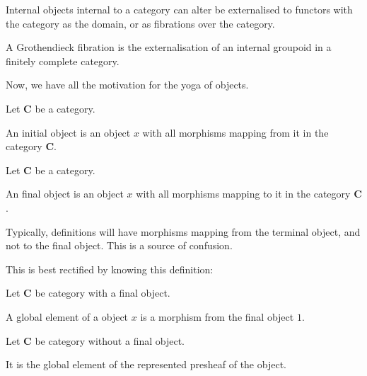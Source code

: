 Internal objects internal to a category can alter be externalised to functors with the category as the domain, or as fibrations over the category.

\begin{definition}
	\label{pseudodefinition-internal-groupoids-externalised}
	A Grothendieck fibration is the externalisation of an
    internal groupoid in a finitely complete category.
\end{definition}

Now, we have all the motivation for the yoga of objects.

\begin{definition}
	\label{definition-initial-object}
	Let $\mathbf{C}$ be a category.

	An initial object is an object $x$ with all morphisms mapping from it in the category $\mathbf{C}$.
\end{definition}

\begin{definition}
	\label{definition-final-object}
	Let $\mathbf{C}$ be a category.

	An final object is an object $x$ with all morphisms mapping to it in the category $\mathbf{C}$.
\end{definition}

Typically, definitions will have morphisms mapping from the terminal object, and not to the final object. This is a source of confusion.

This is best rectified by knowing this definition:

\begin{definition}
	\label{definition-global-element-final}
	Let $\mathbf{C}$ be category with a final object.

    A global element of a object $x$ is a morphism from the final object $1$. 
\end{definition}

\begin{definition}
    \label{definition-global-element-presheaf}
	Let $\mathbf{C}$ be category without a final object.

	It is the global element of the represented presheaf of the object.
\end{definition}

